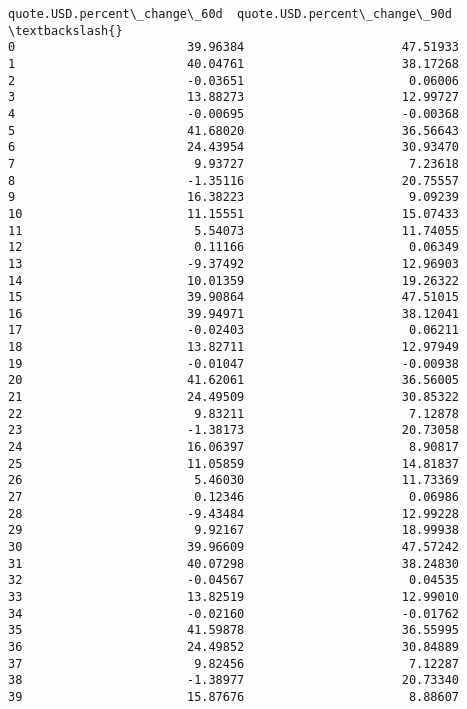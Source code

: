 \documentclass[11pt]{article}
\begin{document}
\begin{tcolorbox}[breakable, size=fbox, boxrule=.5pt, pad at break*=1mm, opacityfill=0]
\begin{Verbatim}[commandchars=\\\{\}]
     quote.USD.percent\_change\_60d  quote.USD.percent\_change\_90d  \textbackslash{}
0                        39.96384                      47.51933
1                        40.04761                      38.17268
2                        -0.03651                       0.06006
3                        13.88273                      12.99727
4                        -0.00695                      -0.00368
5                        41.68020                      36.56643
6                        24.43954                      30.93470
7                         9.93727                       7.23618
8                        -1.35116                      20.75557
9                        16.38223                       9.09239
10                       11.15551                      15.07433
11                        5.54073                      11.74055
12                        0.11166                       0.06349
13                       -9.37492                      12.96903
14                       10.01359                      19.26322
15                       39.90864                      47.51015
16                       39.94971                      38.12041
17                       -0.02403                       0.06211
18                       13.82711                      12.97949
19                       -0.01047                      -0.00938
20                       41.62061                      36.56005
21                       24.49509                      30.85322
22                        9.83211                       7.12878
23                       -1.38173                      20.73058
24                       16.06397                       8.90817
25                       11.05859                      14.81837
26                        5.46030                      11.73369
27                        0.12346                       0.06986
28                       -9.43484                      12.99228
29                        9.92167                      18.99938
30                       39.96609                      47.57242
31                       40.07298                      38.24830
32                       -0.04567                       0.04535
33                       13.82519                      12.99010
34                       -0.02160                      -0.01762
35                       41.59878                      36.55995
36                       24.49852                      30.84889
37                        9.82456                       7.12287
38                       -1.38977                      20.73340
39                       15.87676                       8.88607

\end{Verbatim}
\end{tcolorbox}
\end{document}
